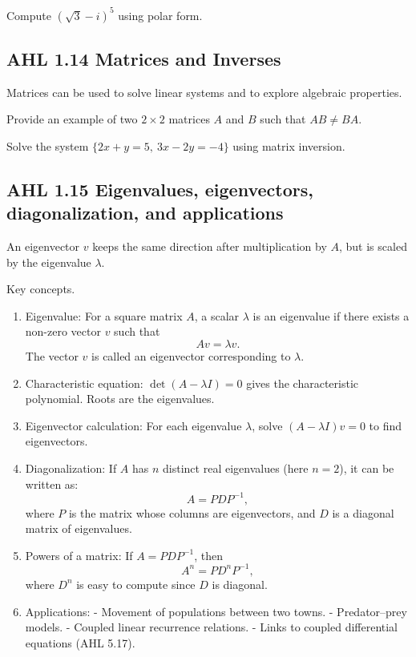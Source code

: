 \documentclass[11pt]{article}
\def\textbf#1{#1}%
\def\textit#1{#1}%
\def\mathbf#1{#1}%
\newcommand{\tocsubsection}[1]{\subsection{#1}}
\newcounter{question}
\begin{document}
\begin{question}
Compute $(\sqrt{3}-i)^5$ using polar form.
\end{question}

\tocsubsection{AHL  1.14  \; Matrices and Inverses}
Matrices can be used to solve linear systems and to explore algebraic properties.

\begin{question}
Provide an example of two $2\times2$ matrices $A$ and $B$ such that $AB\ne BA$.
\end{question}

\begin{question}
Solve the system $\{2x+y=5,\ 3x-2y=-4\}$ using matrix inversion.
\end{question}


\tocsubsection{AHL 1.15 \quad Eigenvalues, eigenvectors, diagonalization, and applications}


\textit{An eigenvector $\mathbf{v}$ keeps the same direction after multiplication by $A$, but is scaled by the eigenvalue $\lambda$.}



\textbf{Key concepts.}
\begin{enumerate}[itemsep=2pt]
  \item \textbf{Eigenvalue:} For a square matrix $A$, a scalar $\lambda$ is an eigenvalue if there exists a non-zero vector $\mathbf{v}$ such that
    \[
      A\mathbf{v} = \lambda \mathbf{v}.
    \]
    The vector $\mathbf{v}$ is called an \textbf{eigenvector} corresponding to $\lambda$.
  
  \item \textbf{Characteristic equation:}  
    $\det(A - \lambda I) = 0$ gives the characteristic polynomial. Roots are the eigenvalues.

  \item \textbf{Eigenvector calculation:}  
    For each eigenvalue $\lambda$, solve $(A - \lambda I)\mathbf{v} = \mathbf{0}$ to find eigenvectors.

  \item \textbf{Diagonalization:}  
    If $A$ has $n$ distinct real eigenvalues (here $n=2$), it can be written as:
    \[
      A = P D P^{-1},
    \]
    where $P$ is the matrix whose columns are eigenvectors, and $D$ is a diagonal matrix of eigenvalues.

  \item \textbf{Powers of a matrix:}  
    If $A = P D P^{-1}$, then
    \[
      A^n = P D^n P^{-1},
    \]
    where $D^n$ is easy to compute since $D$ is diagonal.

  \item \textbf{Applications:}  
    - Movement of populations between two towns.  
    - Predator–prey models.  
    - Coupled linear recurrence relations.  
    - Links to coupled differential equations (AHL 5.17).
\end{enumerate}
\end{document}
